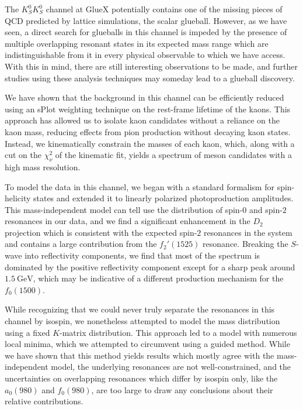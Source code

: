 The $K_S^0K_S^0$ channel at GlueX potentially contains one of the missing pieces of QCD predicted by lattice simulations, the scalar glueball. However, as we have seen, a direct search for glueballs in this channel is impeded by the presence of multiple overlapping resonant states in its expected mass range which are indistinguishable from it in every physical observable to which we have access. With this in mind, there are still interesting observations to be made, and further studies using these analysis techniques may someday lead to a glueball discovery.

We have shown that the background in this channel can be efficiently reduced using an sPlot weighting technique on the rest-frame lifetime of the kaons. This approach has allowed us to isolate kaon candidates without a reliance on the kaon mass, reducing effects from pion production without decaying kaon states. Instead, we kinematically constrain the masses of each kaon, which, along with a cut on the $\chi^2_\nu$ of the kinematic fit, yields a spectrum of meson candidates with a high mass resolution.

To model the data in this channel, we began with a standard formalism for spin-helicity states and extended it to linearly polarized photoproduction amplitudes. This mass-independent model can tell use the distribution of spin-$0$ and spin-$2$ resonances in our data, and we find a significant enhancement in the $D_2$ projection which is consistent with the expected spin-$2$ resonances in the system and contains a large contribution from the $f_2'(1525)$ resonance. Breaking the $S$-wave into reflectivity components, we find that most of the spectrum is dominated by the positive reflectivity component except for a sharp peak around $\SI{1.5}{\giga\electronvolt}$, which may be indicative of a different production mechanism for the $f_0(1500)$.

While recognizing that we could never truly separate the resonances in this channel by isospin, we nonetheless attempted to model the mass distribution using a fixed $K$-matrix distribution. This approach led to a model with numerous local minima, which we attempted to circumvent using a guided method. While we have shown that this method yields results which mostly agree with the mass-independent model, the underlying resonances are not well-constrained, and the uncertainties on overlapping resonances which differ by isospin only, like the $a_0(980)$ and $f_0(980)$, are too large to draw any conclusions about their relative contributions.

